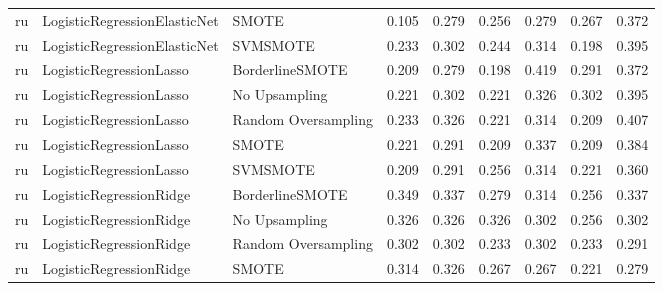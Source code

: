 \begin{tabular}{lllllllll}
      ru & LogisticRegressionElasticNet &               SMOTE &     0.105 &                     0.279 &                 0.256 &                  0.279 &                                   0.267 &     0.372 \\
      ru & LogisticRegressionElasticNet &            SVMSMOTE &     0.233 &                     0.302 &                 0.244 &                  0.314 &                                   0.198 &     0.395 \\
      ru &      LogisticRegressionLasso &     BorderlineSMOTE &     0.209 &                     0.279 &                 0.198 &                  0.419 &                                   0.291 &     0.372 \\
      ru &      LogisticRegressionLasso &       No Upsampling &     0.221 &                     0.302 &                 0.221 &                  0.326 &                                   0.302 &     0.395 \\
      ru &      LogisticRegressionLasso & Random Oversampling &     0.233 &                     0.326 &                 0.221 &                  0.314 &                                   0.209 &     0.407 \\
      ru &      LogisticRegressionLasso &               SMOTE &     0.221 &                     0.291 &                 0.209 &                  0.337 &                                   0.209 &     0.384 \\
      ru &      LogisticRegressionLasso &            SVMSMOTE &     0.209 &                     0.291 &                 0.256 &                  0.314 &                                   0.221 &     0.360 \\
      ru &      LogisticRegressionRidge &     BorderlineSMOTE &     0.349 &                     0.337 &                 0.279 &                  0.314 &                                   0.256 &     0.337 \\
      ru &      LogisticRegressionRidge &       No Upsampling &     0.326 &                     0.326 &                 0.326 &                  0.302 &                                   0.256 &     0.302 \\
      ru &      LogisticRegressionRidge & Random Oversampling &     0.302 &                     0.302 &                 0.233 &                  0.302 &                                   0.233 &     0.291 \\
      ru &      LogisticRegressionRidge &               SMOTE &     0.314 &                     0.326 &                 0.267 &                  0.267 &                                   0.221 &     0.279 \\

\end{tabular}
